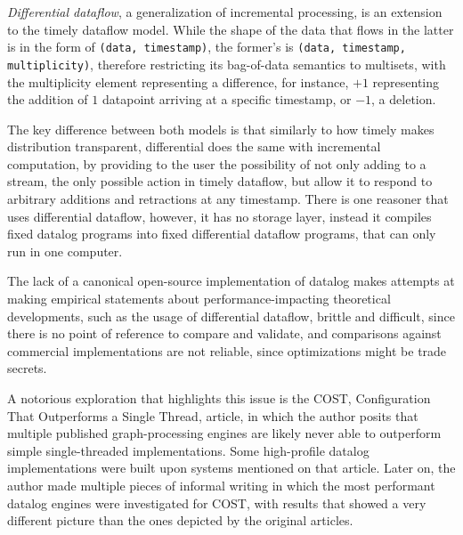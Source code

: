 \documentclass[sigconf,screen,review,natbib]{acmart}
\theoremstyle{definition}
\begin{document}

\emph{Differential dataflow}, a generalization of incremental processing, is an extension to the
timely dataflow model. While the shape of the data that flows in the latter is in the form
of \verb|(data, timestamp)|, the former's is \verb|(data, timestamp, multiplicity)|, therefore
restricting its bag-of-data semantics to multisets, with the multiplicity element representing a
difference, for instance, $+1$ representing the addition of $1$ datapoint arriving at a
specific timestamp, or $-1$, a deletion.

The key difference between both models is that similarly to how timely makes distribution
transparent, differential does the same with incremental computation, by providing to the user the
possibility of not only adding to a stream, the only possible action in timely dataflow, but
allow it to respond to arbitrary additions and retractions at any timestamp.  There is one
reasoner that uses differential dataflow\cite{ddlog}, however, it has no storage layer, instead
it compiles fixed datalog programs into fixed differential dataflow programs, that can only run in one computer.

The lack of a canonical open-source implementation of datalog makes attempts at making
empirical statements about performance-impacting theoretical developments, such as the usage of
differential dataflow, brittle and difficult, since there is no point of reference to
compare and validate, and comparisons against commercial implementations are not
reliable, since optimizations might be trade secrets.

A notorious exploration that highlights this issue is the COST, Configuration That Outperforms
a Single Thread, article\cite{COST}, in which the author posits that multiple published
graph-processing engines are likely never able to outperform simple single-threaded implementations.
Some high-profile datalog implementations were built upon systems mentioned on that article.
Later on, the author made multiple pieces of informal writing in which the most performant datalog
engines were investigated for COST\cite{blogdynamicdatalog, blogvldbsigmod}, with results that
showed a very different picture than the ones depicted by the original articles.
\end{document}
